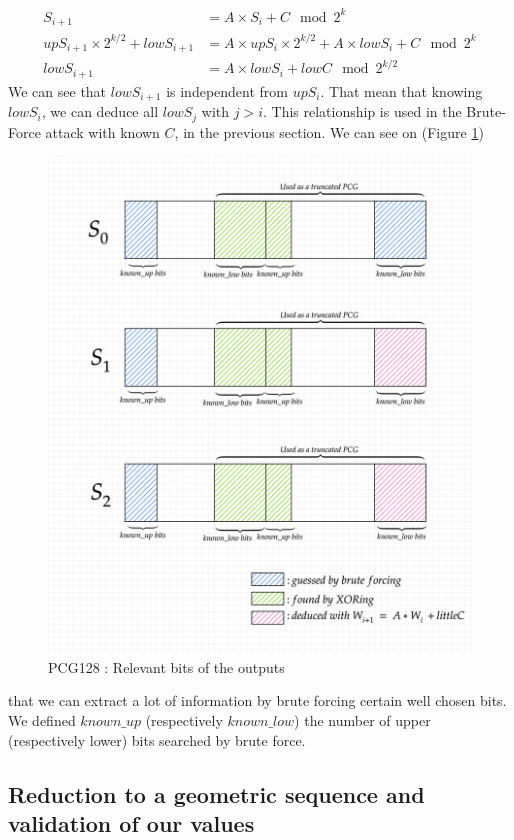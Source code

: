 \documentclass[preprint]{iacrtrans}
\begin{document}
\begin{align}
    S_{i+1} &= A \times S_i + C \mod{2^k}\\
    upS_{i+1} \times 2^{k/2} + lowS_{i+1} &= A \times upS_i \times 2^{k/2} + A \times lowS_i + C \mod{2^k} \\
    lowS_{i+1} &= A \times lowS_i + lowC \mod 2^{k/2}
\end{align}
We can see that $lowS_{i+1}$ is independent from $upS_i$. That mean that knowing $lowS_i$, we can deduce all $lowS_j$ with $j>i$. This relationship is used in the Brute-Force attack with known $C$, in the previous section.
We can see on (Figure \ref{pcg128goodbits})%
\begin{figure}[h!]
    \centering
    \includegraphics[width=0.70\linewidth]{pictures/deducingPCG128.png}
    \caption{PCG128 : Relevant bits of the outputs}
    \label{pcg128goodbits}
\end{figure}
that we can extract a lot of information by brute forcing certain well chosen bits. We defined $known\_up$ (respectively $known\_low$) the number of upper (respectively lower) bits searched by brute force.


\subsection{Reduction to a geometric sequence and validation of our values}
\end{document}
